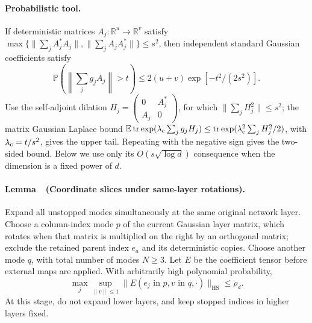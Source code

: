 \documentclass[a4paper]{tufte-handout}
\begin{document}
\begin{fullwidth}
\paragraph{Probabilistic tool.}
If deterministic matrices $A_j:\mathbb R^u\to\mathbb R^v$ satisfy
$\max\{\|\sum_jA_j^*A_j\|,\|\sum_jA_jA_j^*\|\}\leq s^2$, then independent
standard Gaussian coefficients satisfy
\[
 \mathbb P\!\left(\left\|\sum_jg_jA_j\right\|>t\right)
 \leq2(u+v)\exp[-t^2/(2s^2)].
\]
Use the self-adjoint dilation
$H_j=\left(\begin{smallmatrix}0&A_j^*\\ A_j&0\end{smallmatrix}\right)$,
for which $\|\sum_jH_j^2\|\leq s^2$; the matrix Gaussian Laplace bound
$\mathbb E\operatorname{tr}\exp(\lambda_{\rm c}\sum_jg_jH_j)
\leq\operatorname{tr}\exp(\lambda_{\rm c}^2\sum_jH_j^2/2)$,
with $\lambda_{\rm c}=t/s^2$, gives the upper tail. Repeating with the negative sign gives the two-sided bound.
Below we use only its $O(s\sqrt{\log d})$ consequence when the dimension is a fixed power of $d$.

\paragraph{Lemma~\thelemma\ (Coordinate slices under same-layer rotations).}
\label{fp:core-fresh}
Expand all unstopped modes simultaneously at the same original network layer. Choose a column-index mode $p$ of the current Gaussian layer matrix,
which rotates when that matrix is multiplied on the right by an orthogonal matrix; exclude the retained parent index $e_a$ and its deterministic copies.
Choose another mode $q$, with total number of modes $N\ge3$. Let $E$ be the coefficient tensor before external maps are applied.
With arbitrarily high polynomial probability,
\begin{equation}
 \max_j\sup_{\|v\|\leq1}
 \|E(e_j\text{ in }p,v\text{ in }q,\cdot)\|_{\mathrm{HS}}
 \leq\rho_d.
 \label{fp:core-fresh-slice}
\end{equation}
At this stage, do not expand lower layers, and keep stopped indices in higher layers fixed.


\end{fullwidth}
\end{document}
